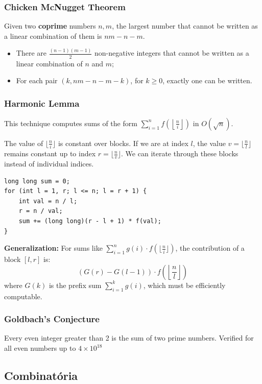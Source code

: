 \subsubsection{Chicken McNugget Theorem}

Given two \textbf{coprime} numbers $n, m$, the largest number that cannot be written as a linear combination of them is $nm - n - m$.

\begin{itemize}
    \item There are $\frac{(n-1)(m-1)}{2}$ non-negative integers that cannot be written as a linear combination of $n$ and $m$;
    \item For each pair $(k, nm - n - m - k)$, for $k \geq 0$, exactly one can be written.
\end{itemize}


\subsubsection{Harmonic Lemma}

This technique computes sums of the form $\sum_{i=1}^{n} f\left(\left\lfloor \frac{n}{i} \right\rfloor\right)$ in $O(\sqrt{n})$.

The value of $\lfloor \frac{n}{i} \rfloor$ is constant over blocks. If we are at index $l$, the value $v = \lfloor \frac{n}{l} \rfloor$ remains constant up to index $r = \lfloor \frac{n}{v} \rfloor$. We can iterate through these blocks instead of individual indices.

\begin{verbatim}
long long sum = 0;
for (int l = 1, r; l <= n; l = r + 1) {
    int val = n / l;
    r = n / val;
    sum += (long long)(r - l + 1) * f(val);
}
\end{verbatim}

\textbf{Generalization:} For sums like $\sum_{i=1}^{n} g(i) \cdot f(\lfloor \frac{n}{i} \rfloor)$, the contribution of a block $[l, r]$ is:
$$ (G(r) - G(l-1)) \cdot f\left(\left\lfloor \frac{n}{l} \right\rfloor\right) $$
where $G(k)$ is the prefix sum $\sum_{i=1}^k g(i)$, which must be efficiently computable.

\subsubsection{Goldbach's Conjecture}
Every even integer greater than 2 is the sum of two prime numbers. Verified for all even numbers up to $4 \times 10^{18}$

\subsection{Combinatória}

